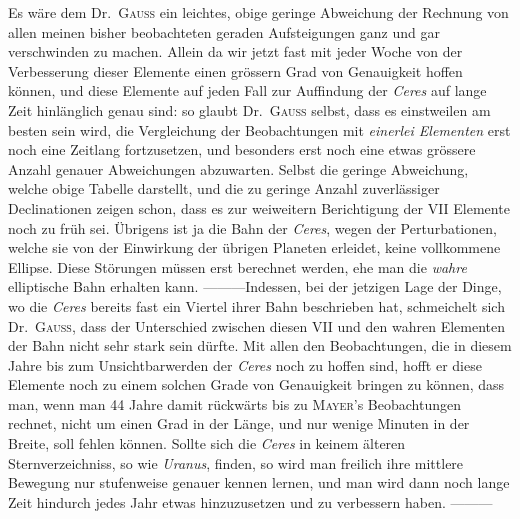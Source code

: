 Es wäre dem Dr.\ \textsc{Gauss} ein leichtes, obige geringe Abweichung der Rechnung von allen meinen bisher beobachteten geraden Aufsteigungen ganz und gar verschwinden zu machen. Allein da wir jetzt fast mit jeder Woche von der Verbesserung dieser Elemente einen grössern Grad von Genauigkeit hoffen können, und diese Elemente auf jeden Fall zur Auffindung der \textit{Ceres} auf lange Zeit hinlänglich genau sind: so glaubt Dr.\ \textsc{Gauss} selbst, dass es einstweilen am besten sein wird, die Vergleichung der Beobachtungen mit \textit{einerlei Elementen} erst noch eine Zeitlang fortzusetzen, und besonders erst noch eine etwas grössere Anzahl genauer Abweichungen abzuwarten. Selbst die geringe Abweichung, welche obige Tabelle darstellt, und die zu geringe Anzahl zuverlässiger Declinationen zeigen schon, dass es zur weiweitern Berichtigung der VII Elemente noch zu früh sei. Übrigens ist ja die Bahn der \textit{Ceres}, wegen der Perturbationen, welche sie von der Einwirkung der übrigen Planeten erleidet, keine vollkommene Ellipse. Diese Störungen müssen erst berechnet werden, ehe man die \textit{wahre} elliptische Bahn erhalten kann. —\quad —\quad —\quad Indessen, bei der jetzigen Lage der Dinge, wo die \textit{Ceres} bereits fast ein Viertel ihrer Bahn beschrieben hat, schmeichelt sich Dr.\ \textsc{Gauss}, dass der Unterschied zwischen diesen VII und den wahren Elementen der Bahn nicht sehr stark sein dürfte. Mit allen den Beobachtungen, die in diesem Jahre bis zum Unsichtbarwerden der \textit{Ceres} noch zu hoffen sind, hofft er diese Elemente noch zu einem solchen Grade von Genauigkeit bringen zu können, dass man, wenn man 44 Jahre damit rückwärts bis zu \textsc{Mayer}'s Beobachtungen rechnet, nicht um einen Grad in der Länge, und nur wenige Minuten in der Breite, soll fehlen können. Sollte sich die \textit{Ceres} in keinem älteren Sternverzeichniss, so wie \textit{Uranus}, finden, so wird man freilich ihre mittlere Bewegung nur stufenweise genauer kennen lernen, und man wird dann noch lange Zeit hindurch jedes Jahr etwas hinzuzusetzen und zu verbessern haben. —\quad —\quad —

